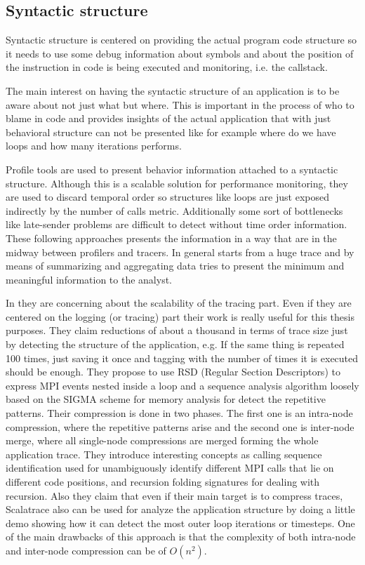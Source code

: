 \documentclass[12pt]{report}
\begin{document}
\subsection{Syntactic structure}

Syntactic structure is centered on providing the actual program code structure so
it needs to use some debug information about symbols and about the position of
the instruction in code is being executed and monitoring, i.e. the callstack.

The main interest on having the syntactic structure of an application is to be
aware about not just what but where. This is important in the process of who to
blame in code and provides insights of the actual application that with just
behavioral structure can not be presented like for example where do we have
loops and how many iterations performs.

Profile tools are used to present behavior information attached to a 
syntactic structure. Although this is a scalable
solution for performance monitoring, they are used to discard temporal order so
structures like loops are just exposed indirectly by the number of calls metric.
Additionally some sort of bottlenecks like late-sender problems are difficult to
detect without time order information. These following approaches presents the
information in a way that are in the midway between profilers and tracers. In
general starts from a huge trace and by means of summarizing and aggregating
data tries to present the minimum and meaningful information to the analyst.

In \cite{noeth2009scalatrace} they are concerning about the scalability of the
tracing part. Even if they are centered on the logging (or tracing) part their
work is really useful for this thesis purposes. They claim reductions of about a
thousand in terms of trace size just by detecting the structure of the
application, e.g. If the same thing is repeated 100 times, just saving it once
and tagging with the number of times it is executed should be enough. They
propose to use RSD (Regular Section Descriptors) to express MPI events nested
inside a loop and a sequence analysis algorithm loosely based on the SIGMA
scheme for memory analysis for detect the repetitive patterns. Their compression
is done in two phases. The first one is an intra-node compression, where the
repetitive patterns arise and the second one is inter-node merge, where all
single-node compressions are merged forming the whole application trace.
They introduce interesting concepts as calling sequence identification used for
unambiguously identify different MPI calls that lie on different code positions, 
and recursion folding signatures for dealing with recursion. Also they claim
that even if their main target is to compress traces, Scalatrace also can be
used for analyze the application structure by doing a little demo showing how it
can detect the most outer loop iterations or timesteps. One of the main
drawbacks of this approach is that the complexity of both intra-node and
inter-node compression can be of $O(n^2)$.
\end{document}
